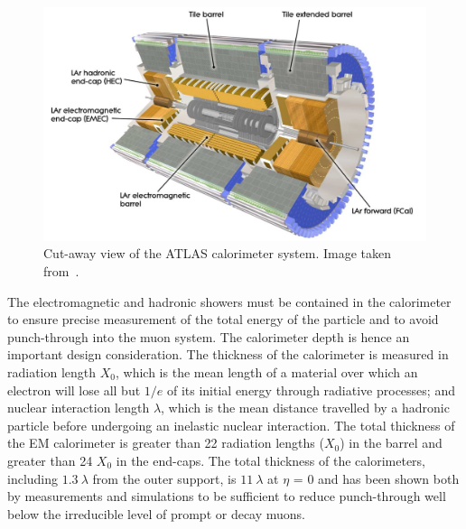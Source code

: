 \begin{figure}[bht]
	\begin{centering}	
	\includegraphics[width=1.0\textwidth]{Detector/plots/calo.png}
	\caption{Cut-away view of the ATLAS calorimeter system. Image taken from~\cite{ATLAS-TDR-01}.}
	\label{fig:calo}
	\end{centering}
\end{figure}
The electromagnetic and hadronic showers must be contained in the 
calorimeter to ensure precise measurement of the total energy of the particle
and to avoid punch-through into the muon system. 
The calorimeter depth is hence an important design consideration. 
The thickness of the calorimeter is measured in radiation length $X_0$,
which is the mean length of a material over which an electron will lose all but $1/e$ 
of its initial energy through radiative processes; and nuclear interaction length $\lambda$,
which is the mean distance travelled by a hadronic particle before undergoing
an inelastic nuclear interaction. 
The total thickness of the EM calorimeter is greater than
22 radiation lengths ($X_0$) in the barrel and greater than 
24 $X_0$ in the end-caps.
The total thickness of the calorimeters, 
including $1.3\ \lambda$ from the outer support, is $11\ \lambda$
at $\eta$ = 0 and has been shown both by measurements and simulations 
to be sufficient to reduce punch-through well below the irreducible 
level of prompt or decay muons. 


